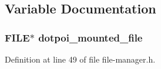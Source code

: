 \subsection{Variable Documentation}
\hypertarget{file-manager_8h_a45917dedb770baeed00c159332c7e736}{
\subsubsection[{dotpoi\-\_\-mounted\-\_\-file}]{\setlength{\rightskip}{0pt plus 5cm}F\-I\-L\-E$\ast$ dotpoi\-\_\-mounted\-\_\-file}}\label{file-manager_8h_a45917dedb770baeed00c159332c7e736}


Definition at line 49 of file file-\/manager.\-h.

